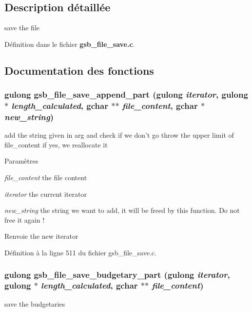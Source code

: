 \subsection{Description détaillée}
save the file 

Définition dans le fichier {\bf gsb\_\-file\_\-save.c}.



\subsection{Documentation des fonctions}
\subsubsection[{gsb\_\-file\_\-save\_\-append\_\-part}]{\setlength{\rightskip}{0pt plus 5cm}gulong gsb\_\-file\_\-save\_\-append\_\-part (gulong {\em iterator}, \/  gulong $\ast$ {\em length\_\-calculated}, \/  gchar $\ast$$\ast$ {\em file\_\-content}, \/  gchar $\ast$ {\em new\_\-string})}\label{gsb__file__save_8c_a53abd581b16b2e5974e4b7b8cbfbd321}
add the string given in arg and check if we don't go throw the upper limit of file\_\-content if yes, we reallocate it


\begin{DoxyParams}{Paramètres}
\item[{\em file\_\-content}]the file content \item[{\em iterator}]the current iterator \item[{\em new\_\-string}]the string we want to add, it will be freed by this function. Do not free it again !\end{DoxyParams}
\begin{DoxyReturn}{Renvoie}
the new iterator 
\end{DoxyReturn}


Définition à la ligne 511 du fichier gsb\_\-file\_\-save.c.

\subsubsection[{gsb\_\-file\_\-save\_\-budgetary\_\-part}]{\setlength{\rightskip}{0pt plus 5cm}gulong gsb\_\-file\_\-save\_\-budgetary\_\-part (gulong {\em iterator}, \/  gulong $\ast$ {\em length\_\-calculated}, \/  gchar $\ast$$\ast$ {\em file\_\-content})}\label{gsb__file__save_8c_a46e773fc842889454bd36ed6e93ac4af}
save the budgetaries


